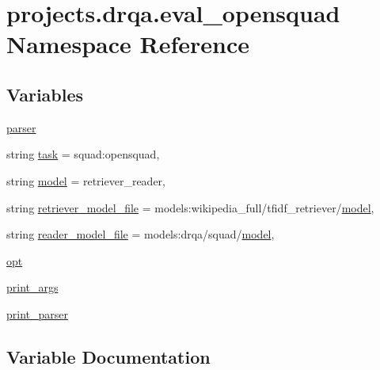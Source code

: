 \hypertarget{namespaceprojects_1_1drqa_1_1eval__opensquad}{}\section{projects.\+drqa.\+eval\+\_\+opensquad Namespace Reference}
\label{namespaceprojects_1_1drqa_1_1eval__opensquad}
\subsection*{Variables}
\begin{DoxyCompactItemize}
\item 
\hyperlink{namespaceprojects_1_1drqa_1_1eval__opensquad_aca05e49477b0c382916133871433dcdf}{parser}
\item 
string \hyperlink{namespaceprojects_1_1drqa_1_1eval__opensquad_a183a58d88e2105a247123fd565b32c33}{task} = \textquotesingle{}squad\+:opensquad\textquotesingle{},
\item 
string \hyperlink{namespaceprojects_1_1drqa_1_1eval__opensquad_a60b0684a4caa747d9ca449286553850c}{model} = \textquotesingle{}retriever\+\_\+reader\textquotesingle{},
\item 
string \hyperlink{namespaceprojects_1_1drqa_1_1eval__opensquad_a5de947a4d562c0c26d1e31fb1d609f05}{retriever\+\_\+model\+\_\+file} = \textquotesingle{}models\+:wikipedia\+\_\+full/tfidf\+\_\+retriever/\hyperlink{namespaceprojects_1_1drqa_1_1eval__opensquad_a60b0684a4caa747d9ca449286553850c}{model}\textquotesingle{},
\item 
string \hyperlink{namespaceprojects_1_1drqa_1_1eval__opensquad_a418110d519aed7a739c2411954800071}{reader\+\_\+model\+\_\+file} = \textquotesingle{}models\+:drqa/squad/\hyperlink{namespaceprojects_1_1drqa_1_1eval__opensquad_a60b0684a4caa747d9ca449286553850c}{model}\textquotesingle{},
\item 
\hyperlink{namespaceprojects_1_1drqa_1_1eval__opensquad_a25d6a556450d3ddc82c089e3dbcae835}{opt}
\item 
\hyperlink{namespaceprojects_1_1drqa_1_1eval__opensquad_a324c68821789ec5a05397439f5656b13}{print\+\_\+args}
\item 
\hyperlink{namespaceprojects_1_1drqa_1_1eval__opensquad_a2859df7a3e2c268e413e14a9c7181160}{print\+\_\+parser}
\end{DoxyCompactItemize}


\subsection{Variable Documentation}
\mbox{\label{namespaceprojects_1_1drqa_1_1eval__opensquad_a60b0684a4caa747d9ca449286553850c}} 
